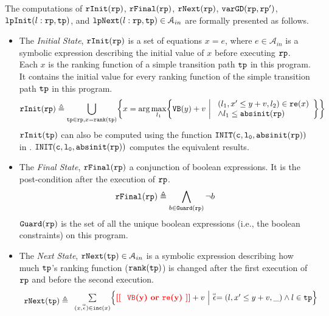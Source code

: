 \begin{defn}
    \label{def:alg-absstate}
   The computations of 
   $\mathtt{rInit}(\mathtt{rp})$, $\mathtt{rFinal}(\mathtt{rp})$, $\mathtt{rNext}(\mathtt{rp})$, $\mathtt{varGD}(\mathtt{rp}, \mathtt{rp}')$, 
   $\mathtt{lpInit}(l: \mathtt{rp}, \mathtt{tp})$, and $\mathtt{lpNext}(l: \mathtt{rp}, \mathtt{tp}) \in \mathcal{A}_{in}$
   are formally presented as follows.
   \begin{itemize}
    \item The \emph{Initial State}, 
    $\mathtt{rInit}(\mathtt{rp})$ is a set of equations $x = e$, where $e \in \mathcal{A}_{in}$ is a
    symbolic expression describing the initial value of $x$ before executing $\mathtt{rp}$.
    Each $x$ is the ranking function of a simple transition path $\mathtt{tp}$ in this program. 
    It contains the initial value for every ranking function of the simple transition path $\mathtt{tp}$ in this program.
   \[
     \rfinit(\rprog) \triangleq 
     \bigcup_{\tpath \in \rprog, x = \locbound(\tpath)}
     \left \{ 
     x = \arg\max_{l_1}\left\{
       \varinvar(y) + v ~\middle\vert~ 
       \begin{array}{l} 
         (l_1, x' \leq y + v, l_2) \in \reset(x) 
         \\
       \land l_1 \leq \absinit(\rprog)
     \end{array}
     \right\}
     \right\}
     \]
   $\mathtt{rInit}(\mathtt{tp})$ can also be computed using the function $\mathtt{INIT(c, l_0, \mathtt{abs}{\mathtt{init}}(\mathtt{rp}))}$ in \cite{GulwaniJK09}. 
   $\mathtt{INIT(c, l_0, \mathtt{abs}{\mathtt{init}}(\mathtt{rp}))}$ computes the equivalent results.
   \item  The \emph{Final State}, $\mathtt{rFinal}(\mathtt{rp})$ a conjunction of boolean expressions.
   It is the post-condition
   after the execution of $\mathtt{rp}$.
   \[
     \mathtt{rFinal}(\mathtt{rp}) \triangleq 
     \bigwedge_{b \in \mathtt{Guard}(\mathtt{rp})}
     \neg b
     \]
    $\mathtt{Guard}(\mathtt{rp})$ is the set of all the unique boolean expressions (i.e., the boolean constraints) on this program.
   \item The \emph{Next State}, $\mathtt{rNext}(\mathtt{tp}) \in \mathcal{A}_{in}$ 
   is a
   symbolic expression describing how much $\mathtt{tp}$'s ranking function ($\mathtt{rank}(\mathtt{tp})$) is changed after the first execution of $\mathtt{rp}$ and before the second execution.
   \[
     \begin{array}{l}
     \rfnext(\tpath) \triangleq 
       \begin{array}{l}
    \sum\limits_{(x, \absevent) \in \inc(x) }
     \left\{ 
       { \todo{ \varinvar(y) or \reset(y)} }+ v ~\middle\vert~ \absevent = (l, x' \leq y + v, \_) \land l \in \tpath\right\}

\end{array}
\end{array}\]
\end{itemize}
\end{defn}
